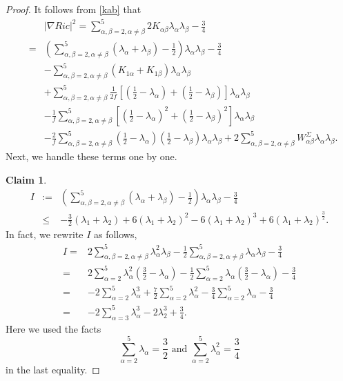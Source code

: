 \documentclass[12pt]{amsart}
\newcommand{\ban}{\begin{eqnarray*}}
\newcommand{\ean}{\end{eqnarray*}}
\begin{document}
	
	\begin{proof}
		It follows from \eqref{kab} that
		\ban
		&&|\nabla Ric|^2=\sum_{\alpha,\beta=2,\alpha\neq\beta}^5 2K_{\alpha\beta}\lambda_{\alpha}\lambda_{\beta}-\frac{3}{4}\\
		 &=&\left(\sum_{\alpha,\beta=2,\alpha\neq\beta}^5(\lambda_{\alpha}+\lambda_{\beta})-{\frac{1}{2}}\right)\lambda_{\alpha}\lambda_{\beta}-\frac{3}{4}\\
		&&-{\sum_{\alpha,\beta=2,\alpha\neq\beta}^5}( K_{1\alpha}+K_{1\beta})\lambda_\alpha\lambda_\beta\\
		&&+\sum_{\alpha,\beta=2,\alpha\neq\beta}^5{\frac{1}{2f}}[({\frac{1}{2}}-\lambda_{\alpha })+({\frac{1}{2}}-\lambda_{\beta})]\lambda_\alpha\lambda_\beta\\
		&&-\frac{1}{f}\sum_{\alpha,\beta=2,\alpha\neq\beta}^5\left[ ({\frac{1}{2}}-\lambda_{\alpha})^2+({\frac{1}{2}}-\lambda_{\beta})^2\right] \lambda_\alpha\lambda_\beta\\
		 &&-\frac{2}{f}\sum_{\alpha,\beta=2,\alpha\neq\beta}^5({\frac{1}{2}}-\lambda_{\alpha})({\frac{1}{2}}-\lambda_{\beta})\lambda_\alpha\lambda_\beta+2\sum_{\alpha,\beta=2,\alpha\neq\beta}^5W^{\Sigma}_{\alpha\beta}\lambda_\alpha\lambda_\beta.
		\ean
		Next, we handle these terms one by one.
		
		\textbf{Claim 1}.
		\ban
		 I&:=&\left(\sum_{\alpha,\beta=2,\alpha\neq\beta}^5(\lambda_{\alpha}+\lambda_{\beta})-{\frac{1}{2}}\right)\lambda_{\alpha}\lambda_{\beta}-\frac{3}{4}\\
		&\leq&-\frac{3}{2}(\lambda_1+\lambda_2)+6(\lambda_1+\lambda_2)^2-6(\lambda_1+\lambda_2)^3+6(\lambda_1+\lambda_2)^{\frac{3}{2}}.
		\ean
		In fact, we rewrite $I$ as follows,
		\begin{equation}\label{i}
		\begin{aligned}
		 I=&2\sum_{\alpha,\beta=2,\alpha\neq\beta}^5\lambda_{\alpha}^2\lambda_{\beta}-\frac{1}{2}\sum_{\alpha,\beta=2,\alpha\neq\beta}^5\lambda_{\alpha}\lambda_{\beta}-\frac{3}{4}\\
		 =&2\sum_{\alpha=2}^5\lambda_{\alpha}^2(\frac{3}{2}-\lambda_\alpha)-\frac{1}{2}\sum_{\alpha=2}^5\lambda_{\alpha}(\frac{3}{2}-\lambda_\alpha)-\frac{3}{4}\\
		 =&-2\sum_{\alpha=2}^5\lambda_{\alpha}^3+\frac{7}{2}\sum_{\alpha=2}^5\lambda_{\alpha}^2-\frac{3}{4}\sum_{\alpha=2}^5\lambda_{\alpha}-\frac{3}{4}\\
		=&-2\sum_{\alpha=3}^5\lambda_{\alpha}^3-2\lambda_{2}^3+\frac{3}{4}.
		\end{aligned}
		\end{equation}
		Here we used the facts
		$$\sum_{\alpha=2}^5\lambda_\alpha=\frac{3}{2}\,\, \text{and}\,\, \sum_{\alpha=2}^5\lambda_\alpha^2=\frac{3}{4}$$ in the last equality.
		

\end{proof}
\end{document}
